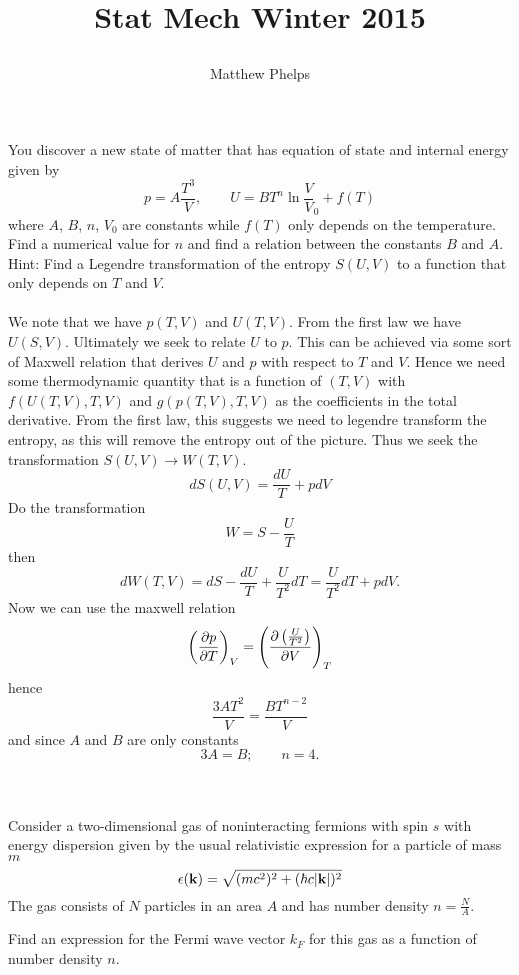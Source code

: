 \documentclass[10pt,letterpaper]{article}
\title{\begin{spacing}{1.2}Stat Mech Winter 2015\end{spacing}}
\author{Matthew Phelps}
\date{}
\begin{document}
\maketitle

\benum
  	 \item
	You discover a new state of matter that has equation of state and internal energy given by
	\[
		p = A\frac{T^3}{V},\qquad U = BT^n\ln\frac{V}V_0 +f(T)
	\]
	where $A$, $B$, $n$, $V_0$ are constants while $f(T)$ only depends on the temperature. Find a
	numerical value for $n$ and find a relation between the constants $B$ and $A$. \\
	Hint: Find a Legendre transformation of the entropy $S(U,V)$ to a function that only depends on
	$T$ and $V$. \\ \\
	
	We note that we have $p(T,V)$ and $U(T,V)$. From the first law we have $U(S,V)$. Ultimately we seek to 
	relate $U$ to $p$. This can be achieved via some sort of Maxwell relation that derives $U$ and $p$ with
	respect to $T$ and $V$. Hence we need some thermodynamic quantity that is a function of $(T,V)$ with 
	$f(U(T,V),T,V)$ and $g(p(T,V),T,V)$ as the coefficients in the total derivative. From the first law, this suggests
	we need to legendre transform the entropy, as this will remove the entropy out of the picture. Thus
	we seek the transformation $S(U,V) \to W(T,V)$.
	\[
		dS(U,V) = \frac{dU}{T}+pdV
	\]
	Do the transformation
	\[
		W = S-\frac{U}{T}
	\]
	then
	\[
		dW(T,V) = dS-\frac{dU}{T}+\frac{U}{T^2}dT = \frac{U}{T^2}dT+pdV.
	\]
	Now we can use the maxwell relation
	\[
		\plr{\pdiff[p]{T}}_V = \plr{\pdiff[\pfrac{U}{T^2}]{V}}_T
	\]
	hence
	\[
		\frac{3AT^2}{V} = \frac{BT^{n-2}}{V}
	\]
	and since $A$ and $B$ are only constants
	\[
		3A = B;\qquad n=4.
	\]
	\\ \\ 
	\item
	Consider a two-dimensional gas of noninteracting fermions with spin $s$ with energy dispersion given by
	the usual relativistic expression for a particle of mass $m$
	\[
		\epsilon(\vect k) = \sqrt{(mc^2)^2+(\h c|\vect k|)^2}
	\]
	The gas consists of $N$ particles in an area $A$ and has number density $n = \frac{N}{A}$. 
	\benum
	\item
	Find an expression for the Fermi wave vector $k_F$ for this gas as a function of number density $n$.
	
\end{document}
